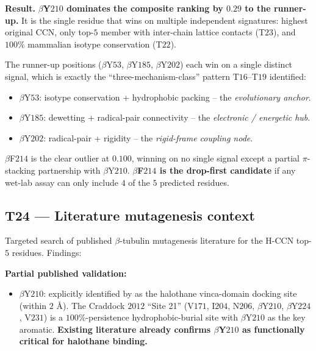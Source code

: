 \documentclass[11pt,a4paper]{article}
\begin{document}
\textbf{Result.} \textbf{$\beta$Y$210$ dominates the composite ranking
by $0.29$ to the runner-up.} It is the single residue that wins on
multiple independent signatures: highest original CCN, only top-$5$
member with inter-chain lattice contacts (T$23$), and $100\%$
mammalian isotype conservation (T$22$).

The runner-up positions ($\beta$Y$53$, $\beta$Y$185$, $\beta$Y$202$)
each win on a single distinct signal, which is exactly the
``three-mechanism-class'' pattern T$16$--T$19$ identified:

\begin{itemize}\itemsep0pt
  \item $\beta$Y$53$: isotype conservation + hydrophobic packing -- the \emph{evolutionary anchor}.
  \item $\beta$Y$185$: dewetting + radical-pair connectivity -- the \emph{electronic / energetic hub}.
  \item $\beta$Y$202$: radical-pair + rigidity -- the \emph{rigid-frame coupling node}.
\end{itemize}

$\beta$F$214$ is the clear outlier at $0.100$, winning on no single
signal except a partial $\pi$-stacking partnership with $\beta$Y$210$.
\textbf{$\beta$F$214$ is the drop-first candidate} if any wet-lab assay
can only include $4$ of the $5$ predicted residues.

\subsection{\textsf{T24} --- Literature mutagenesis context}\label{ssec:t24}

Targeted search of published $\beta$-tubulin mutagenesis literature for
the H-CCN top-$5$ residues. Findings:

\textbf{Partial published validation:}

\begin{itemize}\itemsep0pt
  \item $\beta$Y$210$: explicitly identified by \citet{Craddock2012} as
    the halothane vinca-domain docking site (within $2$ \AA). The
    Craddock $2012$ ``Site 21'' (V$171$, I$204$, N$206$, $\beta$Y$210$,
    $\beta$Y$224$, V$231$) is a $100\%$-persistence hydrophobic-burial
    site with $\beta$Y$210$ as the key aromatic. \textbf{Existing
    literature already confirms $\beta$Y$210$ as functionally critical
    for halothane binding.}
\end{itemize}
\end{document}
